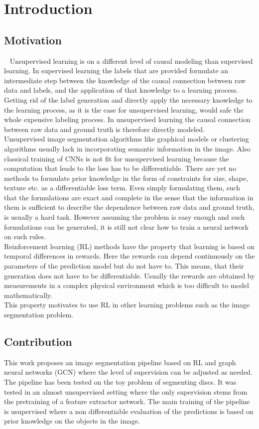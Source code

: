 \chapter{Introduction}
\section{Motivation}~\label{chap:motivation}
Unsupervised learning is on a different level of causal modeling than supervised learning. In supervised learning the labels that are provided formulate an intermediate step between the knowledge of the causal connection between raw data and labels, and the application of that knowledge to a learning process. Getting rid of the label generation and directly apply the necessary knowledge to the learning process, as it is the case for unsupervised learning, would safe the whole expensive labeling process. In unsupervised learning the causal connection between raw data and ground truth is therefore directly modeled.\\
Unsupervised image segmentation algorithms like graphical models or clustering algorithms usually lack in incorporating semantic information in the image. Also classical training of CNNs is not fit for unsupervised learning because the computation that leads to the loss has to be differentiable. There are yet no methods to formulate prior knowledge in the form of constraints for size, shape, texture etc. as a differentiable loss term. Even simply formulating them, such that the formulations are exact and complete in the sense that the information in them is sufficient to describe the dependence between raw data and ground truth, is usually a hard task. However assuming the problem is easy enough and such formulations can be generated, it is still not clear how to train a neural network on such rules.\\
Reinforcement learning (RL) methods have the property that learning is based on temporal differences in rewards. Here the rewards can depend continuously on the parameters of the prediction model but do not have to. This means, that their generation does not have to be differentiable. Usually the rewards are obtained by measurements in a complex physical environment which is too difficult to model mathematically.\\
This property motivates to use RL in other learning problems such as the image segmentation problem.

\section{Contribution}
This work proposes an image segmentation pipeline based on RL and graph neural networks (GCN) where the level of supervision can be adjusted as needed. The pipeline has been tested on the toy problem of segmenting discs. It was tested in an almost unsupervised setting where the only supervision stems from the pretraining of a feature extractor network. The main training of the pipeline is usupervised where a non differentiable evaluation of the predictions is based on prior knowledge on the objects in the image.